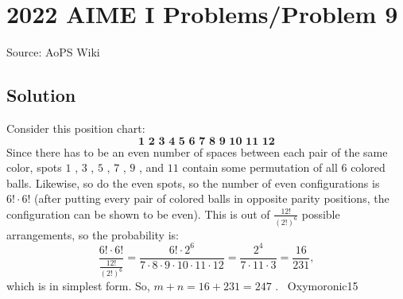 \documentclass[12pt]{article}
\begin{document}
\section*{{2022 AIME I Problems/Problem 9}}
Source: AoPS Wiki

\subsection*{Solution}
Consider this position chart: \[\textbf{1 2 3 4 5 6 7 8 9 10 11 12}\] Since there has to be an even number of spaces between each pair of the same color, spots $1$ , $3$ , $5$ , $7$ , $9$ , and $11$ contain some permutation of all $6$ colored balls. Likewise, so do the even spots, so the number of even configurations is $6! \cdot 6!$ (after putting every pair of colored balls in opposite parity positions, the configuration can be shown to be even). This is out of $\frac{12!}{(2!)^6}$ possible arrangements, so the probability is: \[\frac{6!\cdot6!}{\frac{12!}{(2!)^6}} = \frac{6!\cdot2^6}{7\cdot8\cdot9\cdot10\cdot11\cdot12} = \frac{2^4}{7\cdot11\cdot3} = \frac{16}{231},\] which is in simplest form. So, $m + n = 16 + 231 = \boxed{247}$ . ~Oxymoronic15
\end{document}
